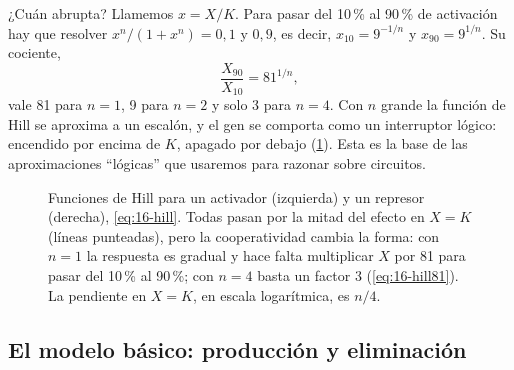 ¿Cuán abrupta? Llamemos $x=X/K$. Para pasar del 10\,\% al 90\,\% de activación hay que resolver $x^n/(1+x^n)=0{,}1$ y $0{,}9$, es decir, $x_{10}=9^{-1/n}$ y $x_{90}=9^{1/n}$. Su cociente,
\begin{equation}\label{eq:16-hill81}
\frac{X_{90}}{X_{10}}=81^{1/n},
\end{equation}
vale 81 para $n=1$, 9 para $n=2$ y solo 3 para $n=4$. Con $n$ grande la función de Hill se aproxima a un escalón, y el gen se comporta como un interruptor lógico: encendido por encima de $K$, apagado por debajo (\cref{fig:16-hill}). Esta es la base de las aproximaciones ``lógicas'' que usaremos para razonar sobre circuitos.

\begin{figure}[t]
\centering
{}
\caption[Funciones de Hill]{Funciones de Hill para un activador (izquierda) y un represor (derecha), \cref{eq:16-hill}. Todas pasan por la mitad del efecto en $X=K$ (líneas punteadas), pero la cooperatividad cambia la forma: con $n=1$ la respuesta es gradual y hace falta multiplicar $X$ por 81 para pasar del 10\,\% al 90\,\%; con $n=4$ basta un factor 3 (\cref{eq:16-hill81}). La pendiente en $X=K$, en escala logarítmica, es $n/4$.}
\label{fig:16-hill}
\end{figure}

\subsection{El modelo básico: producción y eliminación}

